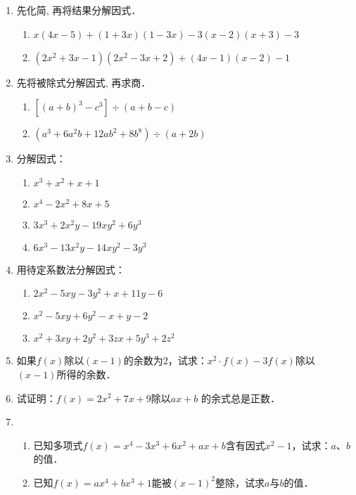 \begin{enumerate}
\item 先化简, 再将结果分解因式．
\begin{enumerate}
    \item  $x(4 x-5)+(1+3 x)(1-3 x)-3(x-2)(x+3)-3$
\item  $\left(2 x^{2}+3 x-1\right)\left(2 x^{2}-3 x+2\right)+(4 x-1)(x-2)-1$
\end{enumerate}

\item 先将被除式分解因式, 再求商．
\begin{enumerate}
    \item $\left[(a+b)^{3}-c^{3}\right]\div (a+b-c)$
\item $\left(a^{3}+6 a^{2} b+12 a b^{2}+8 b^{8}\right)\div (a+2 b)$
\end{enumerate}

\item 分解因式：
\begin{multicols}{2}
\begin{enumerate}
    \item $x^{3}+x^{2}+x+1$
\item $x^{4}-2 x^{2}+8 x+5$ 
\item $3 x^{3}+2 x^{2} y-19 x {y}^{2}+6 y^{3}$
\item $6 x^{3}-13 x^{2} y-14 x y^{2}-3 y^{3}$
\end{enumerate}
\end{multicols}
\item 用待定系数法分解因式：
\begin{enumerate}
\item $2 x^{2}-5 x y-3 y^{2}+x+11 y-6$
\item $x^{2}-5 x y+6 y^{2}-x+y-2 $
\item $x^{2}+3 x y+2 y^{2}+3 z x+5 y^{3}+2 z^{2}$
\end{enumerate}


\item 如果$f(x)$除以$(x-1)$的余数为2，试求：$x^2\cdot f(x)-3f(x)$除以$(x-1)$所得的余数．

\item 试证明：$f(x)=2x^2+7x+9$除以$ax+b$ 的余式总是正数．
\item 
\begin{enumerate}
\item 已知多项式$f(x)=x^4-3x^3+6x^2+ax+b$含有因式$x^2-1$，试求：$a$、$b$的值．
\item 已知$f(x)=ax^4+bx^3+1$能被$(x-1)^2$整除，试求$a$与$b$的值．
\end{enumerate}


\end{enumerate}
